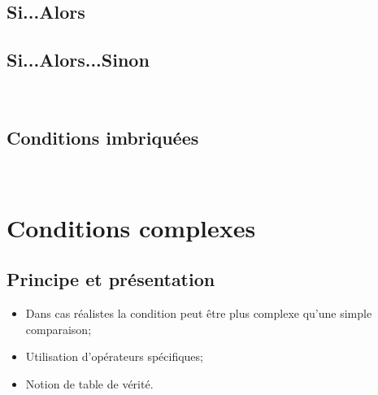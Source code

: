 \documentclass[12pt,a4paper]{article}
\begin{document}
	\subsection{Si...Alors}
	
		\begin{algorithm}[h!]
		\end{algorithm}
	
	
	\subsection{Si...Alors...Sinon}
	
		\begin{algorithm}[h!]
		\end{algorithm}
	\ 
	
	\subsection{Conditions imbriquées}
	
	\ 
	
		\begin{algorithm}[h!]
		\end{algorithm}

\section{Conditions complexes}

	\subsection{Principe et présentation}
	
		\begin{itemize}
			\item Dans cas réalistes la condition peut être plus complexe qu'une simple comparaison;
			\item Utilisation d'opérateurs spécifiques;
			\item Notion de table de vérité.
		\end{itemize}
		
\end{document}
